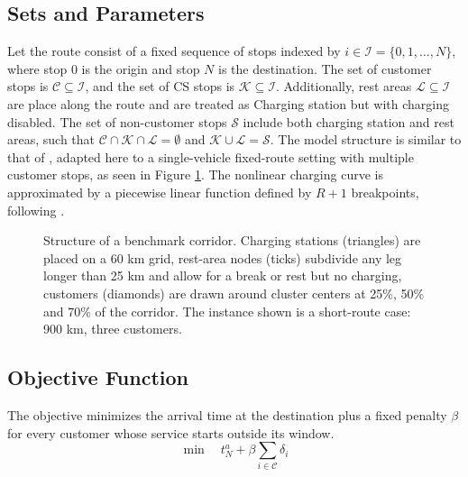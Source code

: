 \subsection{Sets and Parameters}
Let the route consist of a fixed sequence of stops indexed by $i \in \mathcal{I} = \{0, 1, \ldots, N\}$, where stop $0$ is the origin and stop $N$ is the destination. The set of customer stops is $\mathcal{C} \subseteq \mathcal{I}$, and the set of CS stops is $\mathcal{K} \subseteq \mathcal{I}$. Additionally, rest areas $\mathcal{L} \subseteq \mathcal{I}$ are place along the route and are treated as Charging station but with charging disabled. The set of non-customer stops $\mathcal S$ include both charging station and rest areas, such that  $\mathcal{C} \cap \mathcal{K} \cap \mathcal{L} = \emptyset$ and $\mathcal{K} \cup \mathcal{L} = \mathcal S$.  The model structure is similar to that of \citet{bai_rollout-based_2023}, adapted here to a single-vehicle fixed-route setting with multiple customer stops, as seen in Figure \ref{fig:routeExample}.
The nonlinear charging curve is approximated by a piecewise linear function defined by $R+1$ breakpoints, following \citet{montoya_electric_2017}.

\begin{figure}[htbp]
    \centering
    \caption{Structure of a benchmark corridor. Charging stations (triangles) are placed on a 60 km grid,  rest-area nodes (ticks) subdivide any leg longer than 25 km and allow for a break or rest but no charging, customers (diamonds) are drawn around cluster centers at 25\%, 50\% and 70\% of the corridor. The instance shown is a short-route case: 900 km, three customers.}
    \label{fig:routeExample}
\end{figure}

\subsection{Objective Function}
The objective minimizes the arrival time at the destination plus a fixed penalty $\beta$ for every customer whose service starts outside its window.
\begin{equation}
    \min \quad t_N^a + \beta \sum_{i \in \mathcal C}\delta_i
\end{equation}

